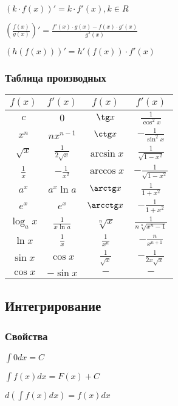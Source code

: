$ (k\cdot f(x))' = k\cdot f'(x), k \in R $

$ \left(\frac{f(x)}{g(x)}\right)' = \frac{f'(x)\cdot g(x) - f(x)\cdot g'(x)}{g^2(x)} $

$ (h(f(x)))' = h'(f(x)) \cdot f'(x) $

\subsubsection{Таблица производных}

\begin{tabu}[t]{||c|c||c|c||}
	\hline
		$ f(x) $ & $ f'(x) $ & $ f(x) $ &  $ f'(x) $ \\
	\hline
		$ c $ & $ 0 $ & $ \tg x $ &  $ \frac{1}{\cos^2 x} $ \\
	\hline
		$ x^n $ & $ nx^{n-1} $ & $ \ctg x $ &  $ -\frac{1}{\sin^2 x} $ \\
	\hline
		$ \sqrt{x} $ & $ \frac{1}{2\sqrt{x}} $ & $ \arcsin x $ &  $ \frac{1}{\sqrt{1-x^2}} $ \\
	\hline
		$ \frac{1}{x} $ & $ -\frac{1}{x^2} $ & $ \arccos x $ &  $ -\frac{1}{\sqrt{1-x^2}} $ \\
	\hline
		$ a^x $ & $ a^x \ln a $ & $ \arctg x $ &  $ \frac{1}{1+x^2} $ \\
	\hline
		$ e^x $ & $ e^x $ & $ \arcctg x $ &  $ -\frac{1}{1+x^2} $ \\
	\hline
		$ \log_a x $ & $ \frac{1}{x \ln a} $ & $ \sqrt[n]{x} $ &  $ \frac{1}{n\sqrt[n]{x^n-1}} $ \\
	\hline
		$ \ln x $ & $ \frac{1}{x} $ & $ \frac{1}{x^n} $ &  $ -\frac{n}{x^{n+1}} $ \\
	\hline
		$ \sin x $ & $ \cos x $ & $ \frac{1}{\sqrt{x}} $ &  $ -\frac{1}{2x\sqrt{x}} $ \\
	\hline
		$ \cos x $ & $ -\sin x $ & $ - $ &  $ - $ \\
	\hline
\end{tabu}

\subsection{Интегрирование}

\subsubsection{Свойства}

$ \int 0 dx = C $

$ \int f(x) dx = F(x) + C $

$ d(\int f(x) dx) = f(x) dx $

